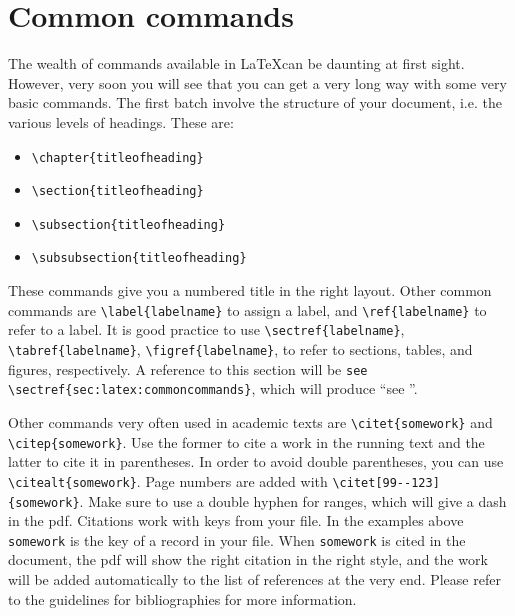 \section{Common commands}\label{sec:latex:commoncommands}
The wealth of commands available in \LaTeX can be daunting at first sight. However, very soon you will see that you can get a very long way with some very basic commands. The first batch involve the structure of your document, i.e. the various levels of headings. These are:
\begin{itemize}
\item \verb+\chapter{titleofheading}+
\item \verb+\section{titleofheading}+
\item \verb+\subsection{titleofheading}+
\item \verb+\subsubsection{titleofheading}+
\end{itemize}

These commands give you a numbered title in the right layout.
Other common commands are 
\verb+\label{labelname}+ 
to assign a label, and 
\verb+\ref{labelname}+
to refer to a label. It is good practice to use 
\verb+\sectref{labelname}+,
\verb+\tabref{labelname}+,
\verb+\figref{labelname}+,
to refer to sections, tables, and figures, respectively. A reference to this section will be \verb+see \sectref{sec:latex:commoncommands}+, which will produce ``see ''.

Other commands very often used in academic texts are \verb+\citet{somework}+ and \verb+\citep{somework}+. Use the former to cite a work in the running text and the latter to cite it in parentheses. In order to avoid double parentheses, you can use  \verb+\citealt{somework}+. Page numbers are added with \verb+\citet[99--123]{somework}+. Make sure to use a double hyphen for ranges, which will give a dash in the pdf. Citations work with keys from your \bibtex file. In the examples above \verb+somework+ is the key of a record in your \bibtex file. When \verb+somework+ is cited in the document, the pdf will show the right citation in the right style, and the work will be added automatically to the list of references at the very end. Please refer to the guidelines for bibliographies for more information.



